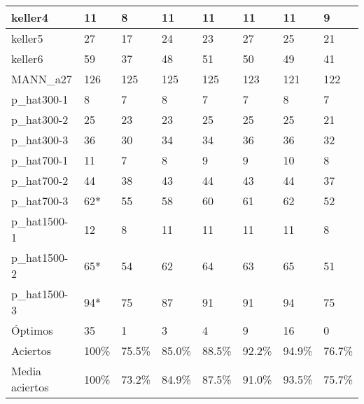 \begin{table}[H]
\begin{tabular}{|l|l|l|l|l|l|l|l|}
keller4            & 11 & 8 & 11 & 11 & 11 & 11 & 9 \\ \hline
keller5            & 27 & 17 & 24 & 23 & 27 & 25 & 21 \\ \hline
keller6            & 59 & 37 & 48 & 51 & 50 & 49 & 41 \\ \hline
MANN\_a27          & 126 & 125 & 125 & 125 & 123 & 121 & 122 \\ \hline
p\_hat300-1        & 8 & 7 & 8 & 7 & 7 & 8 & 7 \\ \hline
p\_hat300-2        & 25 & 23 & 23 & 25 & 25 & 25 & 21 \\ \hline
p\_hat300-3        & 36 & 30 & 34 & 34 & 36 & 36 & 32 \\ \hline
p\_hat700-1        & 11 & 7 & 8 & 9 & 9 & 10 & 8 \\ \hline
p\_hat700-2        & 44 & 38 & 43 & 44 & 43 & 44 & 37 \\ \hline
p\_hat700-3        & 62* & 55 & 58 & 60 & 61 & 62 & 52 \\ \hline
p\_hat1500-1       & 12 & 8 & 11 & 11 & 11 & 11 & 8 \\ \hline
p\_hat1500-2       & 65* & 54 & 62 & 64 & 63 & 65 & 51 \\ \hline
p\_hat1500-3       & 94* & 75 & 87 & 91 & 91 & 94 & 75 \\ \hline
Óptimos            & 35  & 1  & 3  & 4  & 9  & 16 & 0  \\ \hline
Aciertos           & 100\% & 75.5\% & 85.0\% & 88.5\% & 92.2\% & 94.9\% & 76.7\% \\ \hline
Media aciertos     & 100\% & 73.2\% & 84.9\% & 87.5\% & 91.0\% & 93.5\% & 75.7\% \\ \hline
\end{tabular}
\end{table}

